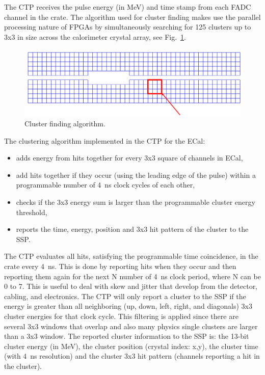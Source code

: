 
The CTP receives the pulse energy (in MeV) and time stamp from each FADC channel in the crate.
The algorithm used for cluster finding makes use the parallel processing nature of FPGAs by simultaneously searching for 125 clusters up to 3x3 in size across the calorimeter crystal array, see 
Fig.~\ref{fig:hps_trigger_3x3}. 
\begin{figure}[h]
\includegraphics[scale=0.4]{daq_trigger/figures/hps_trigger_3x3}
\caption{\small{Cluster finding algorithm.}}
\label{fig:hps_trigger_3x3}
\end{figure}
The clustering algorithm implemented in the CTP for the ECal:
\begin{itemize}
\item adds energy from hits together for every 3x3 square of channels in ECal,
\item add hits together if they occur (using the leading edge of the pulse) within a programmable number of 4~ns clock cycles of each other,
\item checks if the 3x3 energy sum is larger than the programmable cluster energy threshold,
\item  reports the time, energy, position and 3x3 hit pattern of the cluster to the SSP.
\end{itemize}
The CTP evaluates all hits, satisfying the programmable time coincidence, in the crate every 4~ns. This is done by reporting hits when they occur and then reporting them again for the next N number of 4~ns clock period, where N can be 0 to 7. This is useful to deal with skew and jitter that develop from the detector, cabling, and electronics. The CTP will only report a cluster to the SSP if the energy is greater than all neighboring (up, down, left, right, and diagonals) 3x3 cluster energies for that clock cycle. This filtering 
is applied since there are several 3x3 windows that overlap and also many physics single clusters are larger than a 3x3 window. The reported cluster information to the SSP is: the 13-bit cluster energy (in MeV), the cluster position (crystal index: x,y), the cluster time (with 4~ns resolution) and the cluster 3x3 hit pattern (channels reporting a hit in the cluster).

